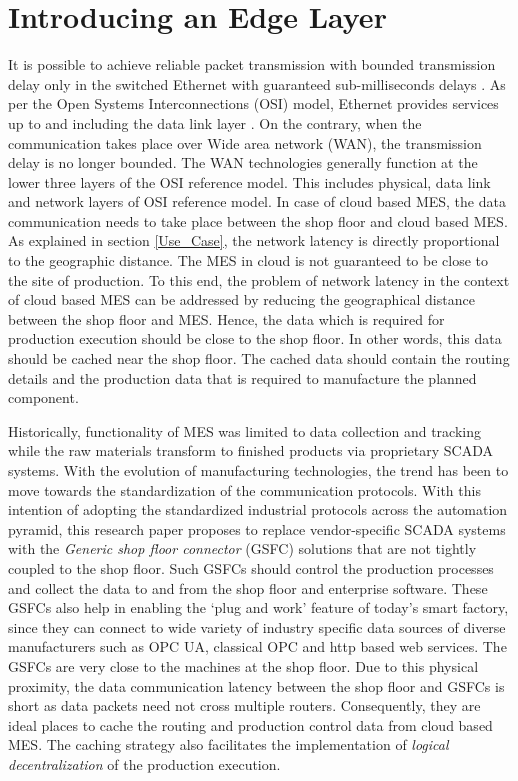 \documentclass[10pt,conference,compsocconf]{IEEEtran}
\begin{document}
\section{Introducing an Edge Layer}
It is possible to achieve reliable packet transmission with bounded transmission delay only in the switched Ethernet with guaranteed sub-milliseconds delays \cite{Loeser_Haertig:2004:Low_Latency}. As per the Open Systems Interconnections (OSI) model, Ethernet provides services up to and including the data link layer \cite{Data_link_layer}. On the contrary, when the communication takes place over Wide area network (WAN), the transmission delay is no longer bounded. The WAN technologies generally function at the lower three layers of the OSI reference model. This includes physical, data link and network layers of OSI reference model. In case of cloud based MES, the data communication needs to take place between the shop floor and cloud based MES. As explained in section \ref{Use_Case}, the network latency is directly proportional to the geographic distance. The MES in cloud is not guaranteed to be close to the site of production. To this end, the problem of network latency in the context of cloud based MES can be addressed by reducing the geographical distance between the shop floor and MES. Hence, the data which is required for production execution should be close to the shop floor. In other words, this data should be cached near the shop floor. The cached data should contain the routing details and the production data that is required to manufacture the planned component.

Historically, functionality of MES was limited to data collection and tracking while the raw materials transform to finished products via proprietary SCADA systems. With the evolution of manufacturing technologies, the trend has been to move towards the standardization of the communication protocols.  With this intention of adopting the standardized industrial protocols across the automation pyramid, this research paper proposes to replace vendor-specific SCADA systems with the \textit {Generic shop floor connector} (GSFC) solutions that are not tightly coupled to the shop floor. Such GSFCs should control the production processes and collect the data to and from the shop floor and enterprise software. These GSFCs also help in enabling the ‘plug and work’ feature of today’s smart factory, since they can connect to wide variety of industry specific data sources of diverse manufacturers such as OPC UA, classical OPC and http based web services. The GSFCs are very close to the machines at the shop floor. Due to this physical proximity, the data communication latency between the shop floor and GSFCs is short as data packets need not cross multiple routers. Consequently, they are ideal places to cache the routing and production control data from cloud based MES. The caching strategy also facilitates the implementation of \textit{logical decentralization} of the production execution.
\end{document}
